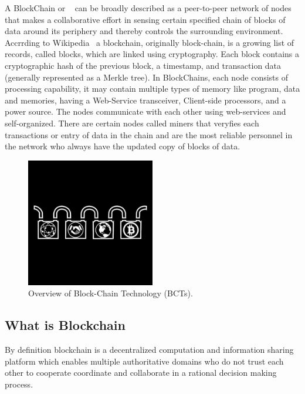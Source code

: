 A BlockChain or \textbf{} ~\cite{the_truth_machine} can be broadly described as a peer-to-peer network of nodes that makes a collaborative effort in sensing certain specified chain of blocks of data around its periphery and thereby controls the surrounding environment.
Accrrding to Wikipedia~\cite{blockchain_wiki} a blockchain, originally block-chain, is a growing list of records, called blocks, which are linked using cryptography. Each block contains a cryptographic hash of the previous block, a timestamp, and transaction data (generally represented as a Merkle tree).
In BlockChains, each node consists of processing capability, it may contain multiple types of memory like program, data and memories, having a Web-Service transceiver, Client-side processors, and a power source. The nodes communicate with each other using web-services and self-organized.
There are certain nodes called miners that veryfies each transactions or entry of data in the chain and are the most reliable personnel in the network who always have the updated copy of blocks of data.

\begin{figure}
\begin{center}
\includegraphics[width=0.5\textwidth]{./img_src/blockchain.jpg}
\end{center}
\caption{Overview of Block-Chain Technology (BCTs).}
\end{figure}

\subsection{What is Blockchain}
By definition blockchain is a decentralized computation and information sharing platform which enables multiple authoritative domains who do not trust each other to cooperate coordinate and collaborate in a rational decision making process.

